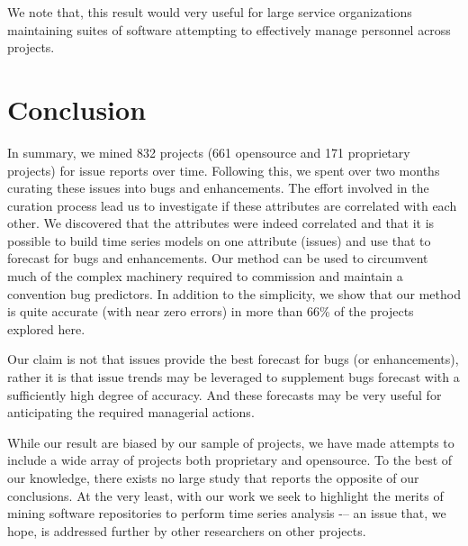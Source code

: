 \documentclass[sigconf, preprint]{acmart}
\begin{document}
We note that, this result would very useful for large service organizations maintaining suites 
of software attempting to effectively manage personnel across projects. 


\section{Conclusion}
\label{sect:conclusion}
In summary, we mined 832 projects (661 opensource and 171 proprietary projects) for issue reports over time. Following this, we spent over two months curating these issues into bugs and enhancements. The effort involved in the curation process lead us to investigate if these attributes are correlated with each other. We discovered that the attributes were indeed correlated and that it is possible to build time series models on one attribute (issues) and use that to forecast for bugs and enhancements. Our method can be used to circumvent much of the complex machinery required to commission and maintain a convention bug predictors. In addition to the simplicity, we show that our method is quite accurate (with near zero errors) in more than 66\% of the projects explored here. 

Our claim is not that issues provide the best forecast for bugs (or enhancements), rather it is that issue trends may be leveraged to supplement bugs forecast with a sufficiently high degree of accuracy. And these forecasts may be very useful for anticipating the required managerial actions. 

While our result are biased by our sample of projects, we have made attempts to include a wide array of projects both proprietary and opensource. To the
best of our knowledge, there exists no large study that reports the
opposite of our conclusions. At the very least, with our work we seek to highlight the merits of mining software repositories to perform time series analysis -– an issue that, we hope, is addressed further by other researchers on other projects.

\balance

 
\end{document}
